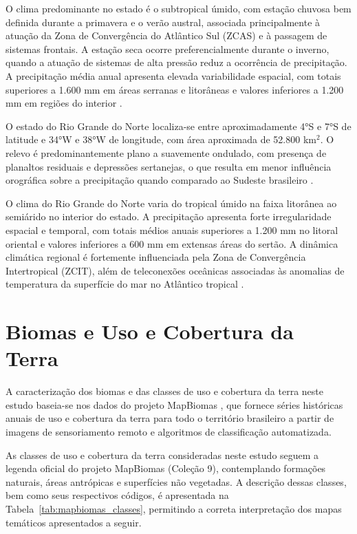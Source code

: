 O clima predominante no estado é o subtropical úmido, com estação chuvosa bem definida durante a primavera e o verão austral, associada principalmente à atuação da Zona de Convergência do Atlântico Sul (ZCAS) e à passagem de sistemas frontais. A estação seca ocorre preferencialmente durante o inverno, quando a atuação de sistemas de alta pressão reduz a ocorrência de precipitação. A precipitação média anual apresenta elevada variabilidade espacial, com totais superiores a 1.600 mm em áreas serranas e litorâneas e valores inferiores a 1.200 mm em regiões do interior \citep{coelho2016}.

O estado do Rio Grande do Norte localiza-se entre aproximadamente 4°S e 7°S de latitude e 34°W e 38°W de longitude, com área aproximada de 52.800 km$^2$. O relevo é predominantemente plano a suavemente ondulado, com presença de planaltos residuais e depressões sertanejas, o que resulta em menor influência orográfica sobre a precipitação quando comparado ao Sudeste brasileiro \citep{ibge_biomas_pagina}.

O clima do Rio Grande do Norte varia do tropical úmido na faixa litorânea ao semiárido no interior do estado. A precipitação apresenta forte irregularidade espacial e temporal, com totais médios anuais superiores a 1.200 mm no litoral oriental e valores inferiores a 600 mm em extensas áreas do sertão. A dinâmica climática regional é fortemente influenciada pela Zona de Convergência Intertropical (ZCIT), além de teleconexões oceânicas associadas às anomalias de temperatura da superfície do mar no Atlântico tropical \citep{marengo2017}.

\section{Biomas e Uso e Cobertura da Terra}

A caracterização dos biomas e das classes de uso e cobertura da terra neste estudo baseia-se nos dados do projeto MapBiomas \citep{mapbiomas_atbd_c8,souza2020_mapbiomas}, que fornece séries históricas anuais de uso e cobertura da terra para todo o território brasileiro a partir de imagens de sensoriamento remoto e algoritmos de classificação automatizada.

As classes de uso e cobertura da terra consideradas neste estudo seguem a legenda oficial do projeto MapBiomas (Coleção 9), contemplando formações naturais, áreas antrópicas e superfícies não vegetadas. A descrição dessas classes, bem como seus respectivos códigos, é apresentada na Tabela~\ref{tab:mapbiomas_classes}, permitindo a correta interpretação dos mapas temáticos apresentados a seguir.

